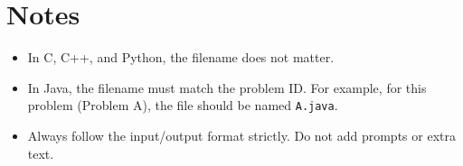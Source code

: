 \documentclass[12pt,a4paper]{article}
\begin{document}
\section*{Notes}
\begin{itemize}
    \item In C, C++, and Python, the filename does not matter.  
    \item In Java, the filename must match the problem ID.  
For example, for this problem (Problem A), the file should be named \texttt{A.java}.  
    \item Always follow the input/output format strictly. Do not add prompts or extra text.  
\end{itemize}
\end{document}
